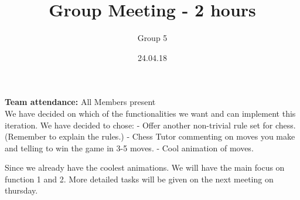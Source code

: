 \documentclass{article}
\title{Group Meeting - 2 hours}
\author{Group 5}
\date{24.04.18}
\begin{document}
	\maketitle
	\noindent
	\textbf{Team attendance:}  All Members present \\

	\noindent
	We have decided on which of the functionalities we want and can implement this iteration.
	We have decided to chose:
- Offer another non-trivial rule set for chess. (Remember to explain the rules.)
- Chess Tutor commenting on moves you make and telling to win the game in 3-5 moves.
- Cool animation of moves.

Since we already have the coolest animations. We will have the main focus on function 1 and 2.
More detailed tasks will be given on the next meeting on thursday. 
\end{document}
